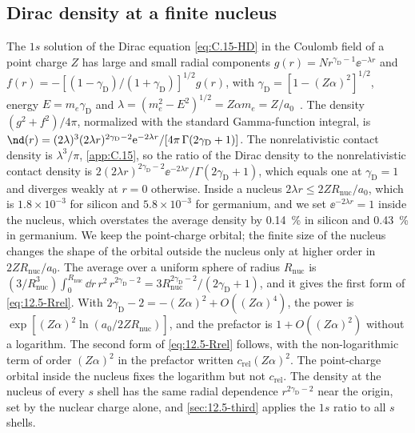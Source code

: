 \subsection{Dirac density at a finite nucleus}\label{app:D.34-dirac}

The $1s$ solution of the Dirac equation \cref{eq:C.15-HD} in the Coulomb field of a point charge $Z$ has large and small radial components $g(r) = N r^{\gamma_{\mathrm{D}} - 1}\ee^{-\lambda r}$ and $f(r) = -[(1 - \gamma_{\mathrm{D}})/(1 + \gamma_{\mathrm{D}})]^{1/2}g(r)$, with $\gamma_{\mathrm{D}} = [1 - (Z\alpha)^2]^{1/2}$, energy $E = m_e\gamma_{\mathrm{D}}$ and $\lambda = (m_e^2 - E^2)^{1/2} = Z\alpha m_e = Z/a_0$~\cite{bjorken1964relativistic}. The density $(g^2 + f^2)/4\pi$, normalized with the standard Gamma-function integral, is $\nd(r) = (2\lambda)^3(2\lambda r)^{2\gamma_{\mathrm{D}} - 2}\ee^{-2\lambda r}/[4\pi\,\Gamma(2\gamma_{\mathrm{D}} + 1)]$. The nonrelativistic contact density is $\lambda^3/\pi$, \cref{app:C.15}, so the ratio of the Dirac density to the nonrelativistic contact density is $2(2\lambda r)^{2\gamma_{\mathrm{D}} - 2}\ee^{-2\lambda r}/\Gamma(2\gamma_{\mathrm{D}} + 1)$, which equals one at $\gamma_{\mathrm{D}} = 1$ and diverges weakly at $r = 0$ otherwise. Inside a nucleus $2\lambda r \le 2ZR_{\mathrm{nuc}}/a_0$, which is $1.8\times10^{-3}$ for silicon and $5.8\times10^{-3}$ for germanium, and we set $\ee^{-2\lambda r} = 1$ inside the nucleus, which overstates the average density by \SI{0.14}{\percent} in silicon and \SI{0.43}{\percent} in germanium. We keep the point-charge orbital; the finite size of the nucleus changes the shape of the orbital outside the nucleus only at higher order in $2ZR_{\mathrm{nuc}}/a_0$. The average over a uniform sphere of radius $R_{\mathrm{nuc}}$ is $(3/R_{\mathrm{nuc}}^3)\int_0^{R_{\mathrm{nuc}}}\dd r\,r^2\,r^{2\gamma_{\mathrm{D}} - 2} = 3R_{\mathrm{nuc}}^{2\gamma_{\mathrm{D}} - 2}/(2\gamma_{\mathrm{D}} + 1)$, and it gives the first form of \cref{eq:12.5-Rrel}. With $2\gamma_{\mathrm{D}} - 2 = -(Z\alpha)^2 + O((Z\alpha)^4)$, the power is $\exp[(Z\alpha)^2\ln(a_0/2ZR_{\mathrm{nuc}})]$, and the prefactor is $1 + O((Z\alpha)^2)$ without a logarithm. The second form of \cref{eq:12.5-Rrel} follows, with the non-logarithmic term of order $(Z\alpha)^2$ in the prefactor written $c_{\mathrm{rel}}(Z\alpha)^2$. The point-charge orbital inside the nucleus fixes the logarithm but not $c_{\mathrm{rel}}$. The density at the nucleus of every $s$ shell has the same radial dependence $r^{2\gamma_{\mathrm{D}} - 2}$ near the origin, set by the nuclear charge alone, and \cref{sec:12.5-third} applies the $1s$ ratio to all $s$ shells.
